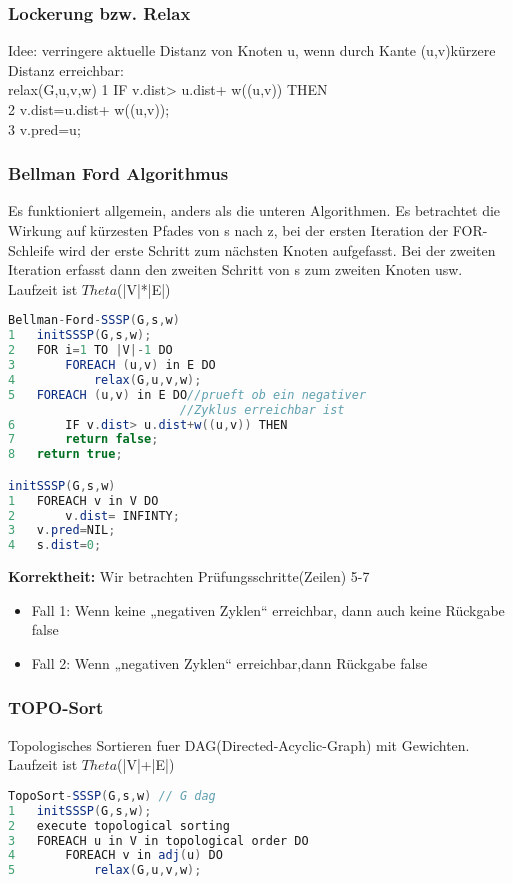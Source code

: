 \documentclass[jou,apacite]{apa6}
\begin{document}
\subsubsection{Lockerung bzw. Relax}
Idee: verringere aktuelle Distanz von Knoten u, wenn durch Kante (u,v)kürzere Distanz erreichbar:\\
relax(G,u,v,w)
1   IF v.dist> u.dist+ w((u,v)) THEN\\
2   v.dist=u.dist+ w((u,v));\\
3   v.pred=u;\\

\subsubsection{Bellman Ford Algorithmus}Es funktioniert allgemein, anders als die unteren Algorithmen. Es betrachtet die Wirkung auf kürzesten Pfades von s nach z, bei der ersten Iteration der FOR-Schleife wird der erste Schritt zum nächsten Knoten aufgefasst. Bei der zweiten Iteration erfasst dann den zweiten Schritt von s zum zweiten Knoten usw. Laufzeit ist $Theta$(|V|*|E|)

\begin{lstlisting}[language=java]
Bellman-Ford-SSSP(G,s,w)
1   initSSSP(G,s,w);
2   FOR i=1 TO |V|-1 DO
3       FOREACH (u,v) in E DO
4           relax(G,u,v,w);
5   FOREACH (u,v) in E DO//prueft ob ein negativer 
                        //Zyklus erreichbar ist
6       IF v.dist> u.dist+w((u,v)) THEN
7       return false;
8   return true;

initSSSP(G,s,w)
1   FOREACH v in V DO
2       v.dist= INFINTY;
3   v.pred=NIL;
4   s.dist=0;
\end{lstlisting}

{\bfseries Korrektheit:} Wir betrachten Prüfungsschritte(Zeilen) 5-7
\begin{itemize}
    \item Fall 1: Wenn keine „negativen Zyklen“ erreichbar, dann auch keine Rückgabe false
    \item Fall 2: Wenn „negativen Zyklen“ erreichbar,dann Rückgabe false
\end{itemize}
\subsubsection{TOPO-Sort}Topologisches Sortieren fuer DAG(Directed-Acyclic-Graph) mit Gewichten. Laufzeit ist $Theta$(|V|+|E|)
\begin{lstlisting}[language =java]
TopoSort-SSSP(G,s,w) // G dag
1   initSSSP(G,s,w);
2   execute topological sorting
3   FOREACH u in V in topological order DO
4       FOREACH v in adj(u) DO
5           relax(G,u,v,w);
\end{lstlisting}
\end{document}

